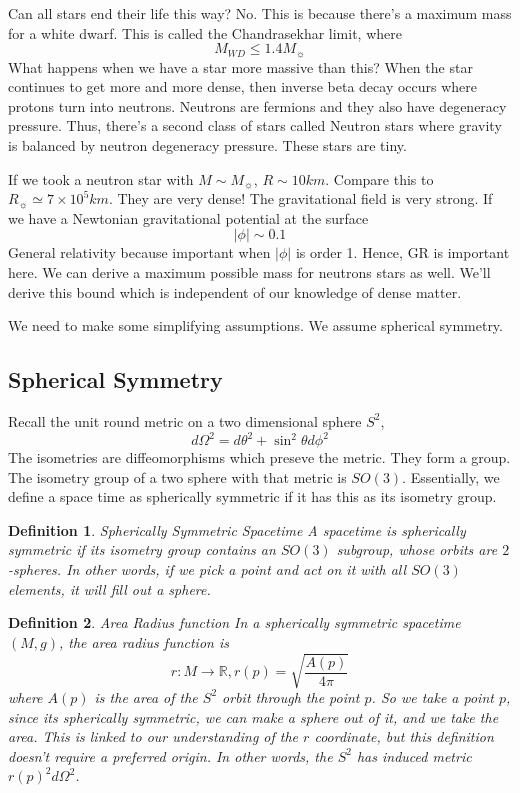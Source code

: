 \documentclass[11pt, oneside]{article}   	%
\theoremstyle{slanted}
\newtheorem*{defn}{Definition}
\begin{document}
Can all stars end their life this way? 
No. This is because there's a maximum mass for a white dwarf. 
This is called the Chandrasekhar limit, where 
\[
M _{ WD } \leq 1.4 M _{ \sun }
\]
What happens when we have a star more massive than this? 
When the star continues to get more and more dense, 
then inverse beta decay occurs where protons turn into neutrons. 
Neutrons are fermions and they also have 
degeneracy pressure. 
Thus, there's a second class of 
stars called Neutron stars where 
gravity is balanced by neutron degeneracy pressure. 
These stars are tiny. 

If we took a neutron star with $  M \sim M _{ \sun } $, $ R \sim 10 km $. 
Compare this to  $ R _{ \sun } \simeq 7 \times 10 ^ 5 km $. 
They are very dense! The gravitational field is very strong. 
If we have a Newtonian gravitational potential at the surface 
\[
| \phi | \sim 0.1 
\]  General relativity because important when $ | \phi | $ is order 1. 
Hence, GR is important here.
We can derive a maximum possible mass for neutrons stars as well. 
We'll derive this bound which is independent of our knowledge of dense matter. 

We need to make some 
simplifying assumptions. 
We assume spherical symmetry. 

\subsection{Spherical Symmetry}
Recall the unit round 
metric on a two dimensional sphere $ S ^ 2 $, 
\[
d \Omega ^ 2  = d \theta ^2 + \sin ^ 2 \theta d \phi ^ 2 
\] The isometries are diffeomorphisms 
which preseve the metric. 
They form a group. 
The isometry group of a two sphere with that metric is $ SO ( 3 ) $. 
Essentially, we define a space time as spherically symmetric 
if it has this as its isometry group. 
\begin{defn}{Spherically Symmetric Spacetime}
A spacetime is spherically symmetric if its isometry group 
contains an $ SO ( 3 ) $ subgroup, whose orbits are
$ 2  $-spheres. 
In other words, if we pick a point and act on it with all 
$ SO ( 3 ) $ elements, it will fill out a sphere. 
\end{defn}
\begin{defn}{Area Radius function}
In a spherically symmetric spacetime $ ( M , g )$, 
the area radius function is 
\[
	r : M \to \mathbb{ R } , r ( p ) = \sqrt{ \frac{ A ( p ) }{ 4 \pi } } 
\] where $ A ( p ) $ is the area of the $ S^ 2 $ orbit 
through the point $ p $. 
So we take a point $ p $, since its spherically symmetric, we 
can make a sphere out of it, and we take the area. 
This is linked to our understanding of the $ r $ coordinate, 
but this definition doesn't require a preferred origin. 
In other words, 
the $ S ^ 2 $ has induced metric $ r ( p ) ^ 2 d \Omega^ 2 $. 
\end{defn}
\end{document}
